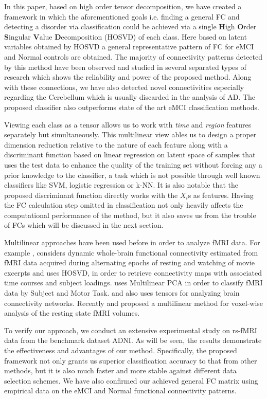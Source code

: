 \documentclass[journal]{IEEEtran}
\begin{document}
	
	In this paper, based on high order tensor decomposition, we have created a framework in which the aforementioned goals i.e. finding a general FC and detecting a disorder via classification could be achieved via a single \textbf{H}igh \textbf{O}rder \textbf{S}ingular \textbf{V}alue \textbf{D}ecomposition (HOSVD) of each class.
	Here based on latent variables obtained by HOSVD a general representative pattern of FC for eMCI and Normal controls are obtained. 
	The majority of connectivity patterns detected by this method have been observed and studied in several separated types of research which shows the reliability and power of the proposed method. Along with these connections, we have also detected novel connectivities especially regarding the Cerebellum which is usually discarded in the analysis of AD.     
	The proposed classifier also outperforms state of the art eMCI classification methods. 
	
	Viewing each class as a tensor allows us to work with \textit{time} and \textit{region} features separately but simultaneously. This multilinear view
	ables us to design a proper dimension reduction relative to the nature of each feature along with a discriminant function based on linear regression on latent space of samples that uses the test data to enhance the quality of the training set without forcing any a prior knowledge to the classifier, a task which is not possible through well known classifiers like SVM, logistic regression or k-NN. It is also notable that the proposed discriminant function directly works with the $X_i$s as features. Having the FC calculation step omitted in classification not only heavily affects the computational performance of the method, but it also saves us from the trouble of FCs which will be discussed in the next section.   
	
	Multilinear approaches have been used before in order to analyze fMRI data. For example \cite{n1}, considers dynamic whole-brain functional connectivity
	estimated from fMRI data acquired during alternating
	epochs of resting and watching of movie excerpts and uses HOSVD, in order to retrieve connectivity maps with associated time courses and subject loadings. \cite{n2} uses Multilinear PCA in order to classify fMRI data 
	by Subject and Motor Task. \cite{n3} and \cite{n4} also uses tensors for analyzing brain connectivity networks. Recently \cite{n5} and \cite{n6} proposed a multilinear method for voxel-wise analysis of the resting state fMRI volumes.  
	
	To verify our approach, we conduct an extensive experimental study on rs-fMRI data from the
	benchmark dataset ADNI.
	As will be seen, the results demonstrate the effectiveness and advantages of our method. Specifically, the proposed framework not only grants us superior classification accuracy to that from other methods, but it is also much faster and more stable against different data selection schemes. We have also confirmed our achieved general FC matrix using empirical data on the eMCI and Normal functional connectivity patterns.
	
\end{document}
